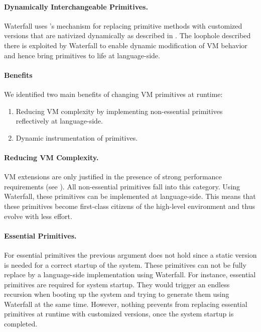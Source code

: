 \paragraph{Dynamically Interchangeable Primitives.}
Waterfall uses \B's mechanism for replacing primitive methods with customized versions that are nativized dynamically as described in .
The loophole described there is exploited by Waterfall to enable dynamic modification of VM behavior and hence bring primitives to life at language-side.


\paragraph{Benefits} 
We identified two main benefits of changing VM primitives at runtime:

\begin{enumerate}
	\item Reducing VM complexity by implementing non-essential primitives reflectively at language-side.
	\item Dynamic instrumentation of primitives.
\end{enumerate}

\paragraph{Reducing VM Complexity.}
VM extensions are only justified in the presence of strong performance requirements (see ).
All non-essential primitives fall into this category.
Using Waterfall, these primitives can be implemented at language-side.
This means that these primitives become first-class citizens of the high-level environment and thus evolve with less effort.

\paragraph{Essential Primitives.}
For essential primitives the previous argument does not hold since a static version is needed for a correct startup of the system.
These primitives can not be fully replace by a language-side implementation using Waterfall.
For instance, essential primitives are required for system startup.
They would trigger an endless recursion when booting up the system and trying to generate them using Waterfall at the same time.
However, nothing prevents from replacing essential primitives at runtime with customized versions, once the system startup is completed. 

